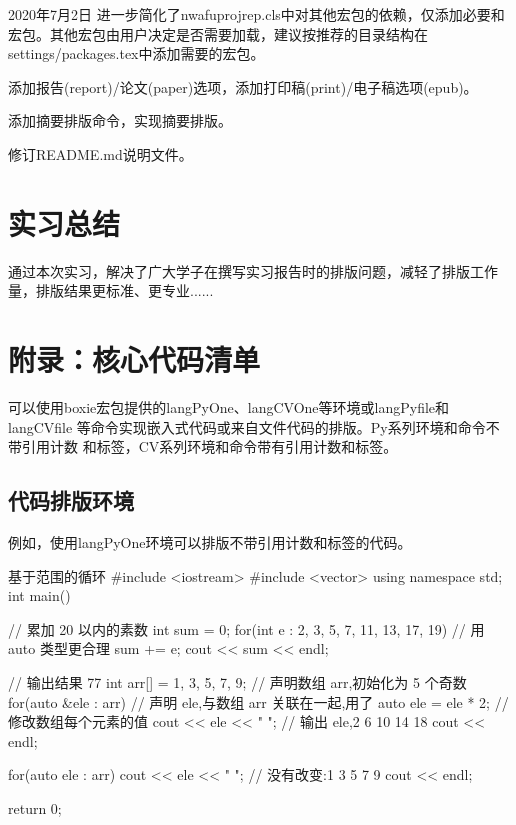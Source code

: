 \documentclass[
  ]{nwafuprojrep}
\begin{document}
\begin{logentry}[简化模板宏包依赖]{2020年7月2日}
  进一步简化了nwafuprojrep.cls中对其他宏包的依赖，仅添加必要和宏包。其他宏包由用户决定是否需要加载，建议按推荐的目录结构在settings/packages.tex中添加需要的宏包。
  
  添加报告(report)/论文(paper)选项，添加打印稿(print)/电子稿选项(epub)。
  
  添加摘要排版命令，实现摘要排版。
  
  修订README.md说明文件。
\end{logentry}

\section{实习总结}
通过本次实习，解决了广大学子在撰写实习报告时的排版问题，减轻了排版工作量，排版结果更标准、更专业......

\section{附录：核心代码清单}\label{secboxiety}
可以使用boxie宏包提供的langPyOne、langCVOne等环境或langPyfile和langCVfile
等命令实现嵌入式代码或来自文件代码的排版。Py系列环境和命令不带引用计数
和标签，CV系列环境和命令带有引用计数和标签。
\subsection{代码排版环境}
例如，使用langPyOne环境可以排版不带引用计数和标签的代码。
\begin{langPyOne}[C++]{基于范围的循环}
#include <iostream>
#include <vector>
using namespace std;
int main()
{
    // 累加 20 以内的素数
    int sum = 0;
    for(int e : {2, 3, 5, 7, 11, 13, 17, 19}) // 用 auto 类型更合理
    {
        sum += e;
    }
    cout << sum << endl;

    // 输出结果 77
    int arr[] = {1, 3, 5, 7, 9};
    // 声明数组 arr,初始化为 5 个奇数
    for(auto &ele : arr)
    {
        // 声明 ele,与数组 arr 关联在一起,用了 auto
        ele = ele * 2;
        // 修改数组每个元素的值
        cout << ele << " ";
        // 输出 ele,2 6 10 14 18
    }
    cout << endl;

    for(auto ele : arr)
    {
        cout << ele << " ";
    }
    // 没有改变:1 3 5 7 9
    cout << endl;

    return 0;
}  
\end{langPyOne}
\end{document}
